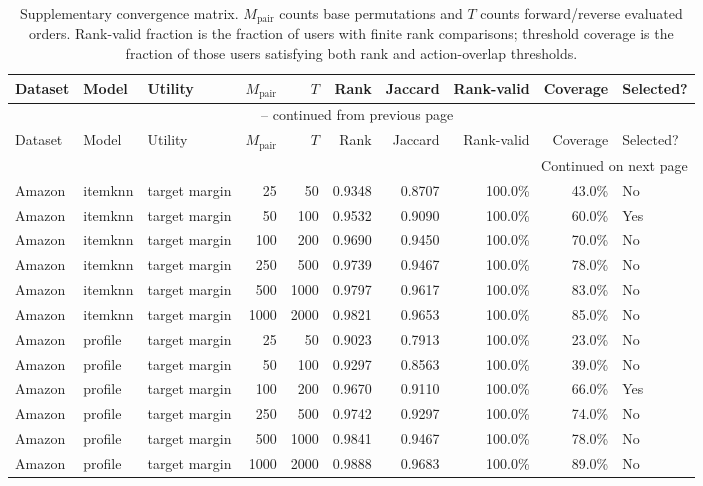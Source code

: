 \begin{longtable}{@{}p{}p{}p{}rrrrrrp{}@{}}
\caption{Supplementary convergence matrix. $M_{\mathrm{pair}}$ counts base permutations and $T$ counts forward/reverse evaluated orders. Rank-valid fraction is the fraction of users with finite rank comparisons; threshold coverage is the fraction of those users satisfying both rank and action-overlap thresholds.}\label{tab:S6}\\
\toprule
Dataset & Model & Utility & $M_{\mathrm{pair}}$ & $T$ & Rank & Jaccard & Rank-valid & Coverage & Selected? \\
\midrule
\endfirsthead
\multicolumn{10}{c}{\tablename\ \thetable{} -- continued from previous page}\\
\toprule
Dataset & Model & Utility & $M_{\mathrm{pair}}$ & $T$ & Rank & Jaccard & Rank-valid & Coverage & Selected? \\
\midrule
\endhead
\midrule
\multicolumn{10}{r}{Continued on next page}\\
\endfoot
\bottomrule
\endlastfoot
Amazon & itemknn & target margin & 25 & 50 & 0.9348 & 0.8707 & 100.0\% & 43.0\% & No \\
Amazon & itemknn & target margin & 50 & 100 & 0.9532 & 0.9090 & 100.0\% & 60.0\% & Yes \\
Amazon & itemknn & target margin & 100 & 200 & 0.9690 & 0.9450 & 100.0\% & 70.0\% & No \\
Amazon & itemknn & target margin & 250 & 500 & 0.9739 & 0.9467 & 100.0\% & 78.0\% & No \\
Amazon & itemknn & target margin & 500 & 1000 & 0.9797 & 0.9617 & 100.0\% & 83.0\% & No \\
Amazon & itemknn & target margin & 1000 & 2000 & 0.9821 & 0.9653 & 100.0\% & 85.0\% & No \\
Amazon & profile & target margin & 25 & 50 & 0.9023 & 0.7913 & 100.0\% & 23.0\% & No \\
Amazon & profile & target margin & 50 & 100 & 0.9297 & 0.8563 & 100.0\% & 39.0\% & No \\
Amazon & profile & target margin & 100 & 200 & 0.9670 & 0.9110 & 100.0\% & 66.0\% & Yes \\
Amazon & profile & target margin & 250 & 500 & 0.9742 & 0.9297 & 100.0\% & 74.0\% & No \\
Amazon & profile & target margin & 500 & 1000 & 0.9841 & 0.9467 & 100.0\% & 78.0\% & No \\
Amazon & profile & target margin & 1000 & 2000 & 0.9888 & 0.9683 & 100.0\% & 89.0\% & No \\

\end{longtable}
